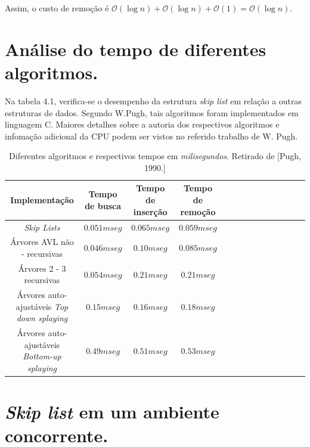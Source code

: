 \documentclass[paper=a4, fontsize=11pt]{scrartcl} %
\numberwithin{equation}{section}
\numberwithin{figure}{section}
\numberwithin{table}{section}
\numberwithin{definition}{section}
\numberwithin{theorem}{section}
\numberwithin{property}{section}
\numberwithin{proposition}{section}
\newcommand{\cO}{\ensuremath{\mathcal{O}}}
\begin{document}
Assim, o custo de remoção é $\cO(\log n) + \cO(\log n) + \cO(1) = \cO(\log n)$.



\section{An\'{a}lise do tempo de diferentes algoritmos.}

Na tabela 4.1, verifica-se o desempenho da estrutura \textit{skip list} em rela\c{c}\~{a}o a outras estruturas de dados. Segundo W.Pugh, tais algoritmos foram implementados em linguagem C. Maiores detalhes sobre a autoria dos respectivos algoritmos e infoma\c{c}\~{a}o adicional  da CPU podem ser vistos no referido trabalho de W. Pugh.  


\begin{table}[htpb]
  \centering
  
   
  \begin{tabular}{|c|c|c|c|c|c|c|c|c|c|c|c|c|c|}
  
  \hline
          Implementa\c{c}\~{a}o & Tempo de busca & Tempo de  inser\c{c}\~{a}o & Tempo de remo\c{c}\~{a}o\\
          \hline
          \textit{Skip Lists} & $0.051 mseg$ & $0.065 mseg$ & $0.059 mseg$\\
          \hline
          \'{A}rvores AVL  n\~{a}o - recursivas & $0.046 mseg$ & $0.10 mseg$ &$0.085 mseg$\\ 
          \hline
           \'{A}rvores 2 - 3 recursivas & $0.054 mseg$ & $0.21 mseg$ & $0.21 mseg$\\
           \hline
          \'{A}rvores auto-ajust\'{a}veis \textit{Top down splaying} & $0.15 mseg$ & $0.16 mseg$ & $0.18 mseg$\\
           \hline
           \'{A}rvores auto-ajust\'{a}veis \textit{Bottom-up splaying} & $0.49 mseg$ & $0.51 mseg$ & $0.53 mseg$\\
           \hline 
  \end{tabular}

 \caption{Diferentes algoritmos e respectivos tempos em \textit{milisegundos}. Retirado de [Pugh, 1990.]}
 
\end{table}


\pagebreak
\section{ \textit{Skip list} em um ambiente concorrente.}
\end{document}
